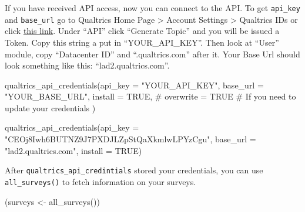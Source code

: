 \documentclass[
  letterpaper,
]{book}
\newenvironment{Shaded}{\begin{snugshade}}{\end{snugshade}}
\newcommand{\AttributeTok}[1]{\textcolor[rgb]{0.40,0.45,0.13}{#1}}
\newcommand{\CommentTok}[1]{\textcolor[rgb]{0.37,0.37,0.37}{#1}}
\newcommand{\ConstantTok}[1]{\textcolor[rgb]{0.56,0.35,0.01}{#1}}
\newcommand{\FunctionTok}[1]{\textcolor[rgb]{0.28,0.35,0.67}{#1}}
\newcommand{\NormalTok}[1]{\textcolor[rgb]{0.00,0.23,0.31}{#1}}
\newcommand{\OtherTok}[1]{\textcolor[rgb]{0.00,0.23,0.31}{#1}}
\newcommand{\StringTok}[1]{\textcolor[rgb]{0.13,0.47,0.30}{#1}}
\begin{document}
If you have received API access, now you can connect to the API. To get
\texttt{api\_key} and \texttt{base\_url} go to Qualtrics Home Page
\textgreater{} Account Settings \textgreater{} Qualtrics IDs or click
\href{https://usfca.qualtrics.com/Q/QualtricsIdsSection/IdsSection}{this
link}. Under ``API'' click ``Generate Topic'' and you will be issued a
Token. Copy this string a put in ``YOUR\_API\_KEY''. Then look at
``User'' module, copy ``Datacenter ID'' and ``.qualtrics.com'' after it.
Your Base Url should look something like this: ``lad2.qualtrics.com''.

\begin{Shaded}
\begin{Highlighting}[]
\FunctionTok{qualtrics\_api\_credentials}\NormalTok{(}\AttributeTok{api\_key =} \StringTok{"YOUR\_API\_KEY"}\NormalTok{, }
                          \AttributeTok{base\_url =} \StringTok{"YOUR\_BASE\_URL"}\NormalTok{,}
                          \AttributeTok{install =} \ConstantTok{TRUE}\NormalTok{,}
                        \CommentTok{\# overwrite = TRUE \# If you need to update your credentials}
\NormalTok{                          )}
\end{Highlighting}
\end{Shaded}

\begin{Shaded}
\begin{Highlighting}[]
\FunctionTok{qualtrics\_api\_credentials}\NormalTok{(}\AttributeTok{api\_key =} \StringTok{"CEOj8Iwh6BUTNZ9J7PXDJLZpStQaXkmlwLPYzCgu"}\NormalTok{, }
                          \AttributeTok{base\_url =} \StringTok{"lad2.qualtrics.com"}\NormalTok{,}
                          \AttributeTok{install =} \ConstantTok{TRUE}\NormalTok{)}
\end{Highlighting}
\end{Shaded}

After \texttt{qualtrics\_api\_credintials} stored your credentials, you
can use \texttt{all\_surveys()} to fetch information on your surveys.

\begin{Shaded}
\begin{Highlighting}[]
\NormalTok{(surveys }\OtherTok{\textless{}{-}} \FunctionTok{all\_surveys}\NormalTok{()) }
\end{Highlighting}
\end{Shaded}
\end{document}
